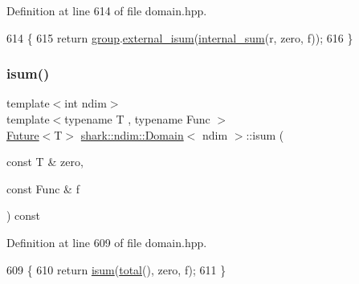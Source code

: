 Definition at line 614 of file domain.\+hpp.


\begin{DoxyCode}
614                                                                                              \{
615             \textcolor{keywordflow}{return} \hyperlink{classshark_1_1ndim_1_1_domain_a2bbf100371762ce405efd218bc1e3d0f}{group}.\hyperlink{classshark_1_1_group_a45c07b72e75f90b39e550e80d7ea2418}{external\_isum}(\hyperlink{classshark_1_1ndim_1_1_domain_ae6b753c7b16ffd14e6247d4b00c92d35}{internal\_sum}(r, zero, f));
616         \}
\end{DoxyCode}
\hypertarget{classshark_1_1ndim_1_1_domain_a9de68dd8f3cbf57cc23a6ddf1c58d569}{}\label{classshark_1_1ndim_1_1_domain_a9de68dd8f3cbf57cc23a6ddf1c58d569} 
\subsubsection{\texorpdfstring{isum()}{isum()}\hspace{0.1cm}{\footnotesize\ttfamily [3/3]}}
{\footnotesize\ttfamily template$<$int ndim$>$ \\
template$<$typename T , typename Func $>$ \\
\hyperlink{structshark_1_1_future}{Future}$<$T$>$ \hyperlink{classshark_1_1ndim_1_1_domain}{shark\+::ndim\+::\+Domain}$<$ ndim $>$\+::isum (\begin{DoxyParamCaption}\item[{const T \&}]{zero,  }\item[{const Func \&}]{f }\end{DoxyParamCaption}) const\hspace{0.3cm}{\ttfamily [inline]}}



Definition at line 609 of file domain.\+hpp.


\begin{DoxyCode}
609                                                                               \{
610             \textcolor{keywordflow}{return} \hyperlink{classshark_1_1ndim_1_1_domain_ab00f61852f9957c033d36ddb2f49f0eb}{isum}(\hyperlink{classshark_1_1ndim_1_1_domain_ae4357c99519b3efbaf2544828629de87}{total}(), zero, f);
611         \}
\end{DoxyCode}
\hypertarget{classshark_1_1ndim_1_1_domain_a3351db56f9d6bd22ba473d744e3f7025}{}\label{classshark_1_1ndim_1_1_domain_a3351db56f9d6bd22ba473d744e3f7025} 
